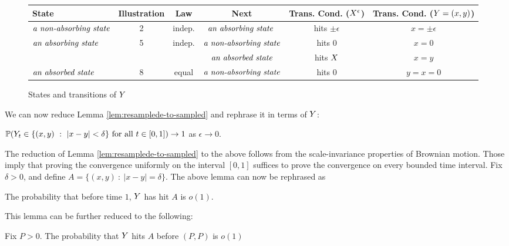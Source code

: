 {\begin{figure}\label{fig:twodimtranstab}
\begin{center}
  \begin{tabular}{| l || c | c | c | c | c | }
    \hline
    State & Illustration & Law & Next & Trans. Cond. ($X^{\epsilon}$) & Trans. Cond. ($Y=(x,y)$) \\
    \hline
    \hline
    $\emph{\text{a non-absorbing state}}$ & 2 & indep. & $\emph{\text{an absorbing state }}$ & hits $\pm\epsilon$ & $x=\pm\epsilon$ \\
    \hline
    \multirow{2}{*}{$\emph{\text{an absorbing state }}$} & \multirow{2}{*}{5} & \multirow{2}{*}{indep.} & $\emph{\text{a non-absorbing state}}$ & hits $0$ & $x=0$ \\ \cline{4-6}
        &  &  & $\emph{\text{an absorbed state}}$ & hits $X$ & $x=y$\\
    \hline
    $\emph{\text{an absorbed state}}$  & 8 & equal & $\emph{\text{a non-absorbing state}}$ &  hits $0$ & $y=x=0$\\
    \hline
  \end{tabular}
\end{center}
\caption{States and transitions of $Y$}
\end{figure}

We can now reduce Lemma \ref{lem:resamplede-to-sampled} and rephrase it in terms of $Y$:
\begin{lemma*}
$\P(\twodim_t \in \{(x,y) \ :\  |x-y|<\delta \} \text{ for all } t \in [0,1])\to1$ as $\epsilon\to 0$.
\end{lemma*}
The reduction of Lemma \ref{lem:resamplede-to-sampled} to the above
follows from the scale-invariance properties of Brownian motion. Those
imply that proving the convergence uniformly on the interval $[0,1]$
suffices to prove the convergence on every bounded time interval.
\newcommand{\boundarylines}{A}
Fix $\delta>0$, and define $\boundarylines=\{(x,y) \ :\  |x-y|=\delta \}$.
The above lemma can now be rephrased as
\begin{lemma*}
  The probability that before time $1$, $Y$ has hit $\boundarylines$
  is $o(1)$.
\end{lemma*}
This lemma can be further reduced to the following:
\newcommand{\farpoint}{(P,P)}
\newcommand{\probhitboundaryis}[1]{Fix $P > 0$.  The probability that $\twodim$
  hits $\boundarylines$ before $\farpoint$ is #1}

\begin{lemma}\label{lem:prob-hit-boundary-o1}
  \probhitboundaryis{$o(1)$}
\end{lemma}

}
